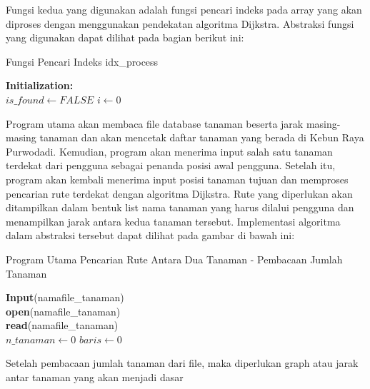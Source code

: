 \documentclass[conference]{IEEEtran}
\begin{document}
Fungsi kedua yang digunakan adalah fungsi pencari indeks
pada array yang akan diproses dengan menggunakan pendekatan
algoritma Dijkstra. Abstraksi fungsi yang digunakan
dapat dilihat pada bagian berikut ini:\\
\begin{algorithm}[hbt!]
\caption{Fungsi Pencari Indeks idx\_process}\label{alg:two}
\textbf{Initialization: } \\
$is\_found \gets FALSE$\;
$i \gets 0$\;
\end{algorithm}
Program utama akan membaca file database tanaman
beserta jarak masing-masing tanaman dan akan mencetak
daftar tanaman yang berada di Kebun Raya Purwodadi.
Kemudian, program akan menerima input salah satu tanaman
terdekat dari pengguna sebagai penanda posisi awal pengguna.
Setelah itu, program akan kembali menerima input posisi
tanaman tujuan dan memproses pencarian rute terdekat dengan
algoritma Dijkstra. Rute yang diperlukan akan ditampilkan
dalam bentuk list nama tanaman yang harus dilalui pengguna
dan menampilkan jarak antara kedua tanaman tersebut.
Implementasi algoritma dalam abstraksi tersebut dapat dilihat
pada gambar di bawah ini:\\
\begin{algorithm}[hbt!]
\caption{Program Utama Pencarian Rute Antara
Dua Tanaman - Pembacaan Jumlah Tanaman}\label{alg:two}
\textbf{Input}(namafile\_tanaman) \\
\textbf{open}(namafile\_tanaman) \\
\textbf{read}(namafile\_tanaman) \\
$n\_tanaman \gets 0$\;
$baris \gets 0$\;
\end{algorithm}
Setelah pembacaan jumlah tanaman dari file, maka diperlukan
graph atau jarak antar tanaman yang akan menjadi dasar
\end{document}
